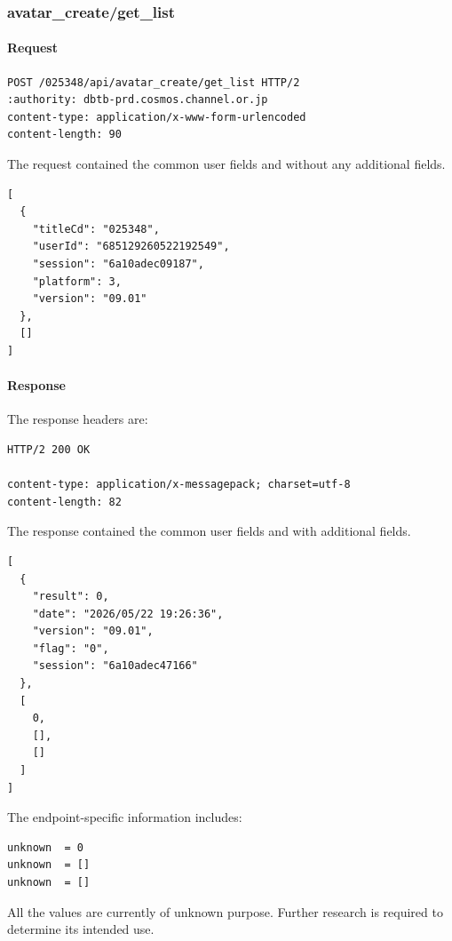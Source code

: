 \subsubsection{avatar\_create/get\_list}
\label{subsec:api_avatar_create_get_list}

\paragraph{Request}

\begin{lstlisting}
POST /025348/api/avatar_create/get_list HTTP/2
:authority: dbtb-prd.cosmos.channel.or.jp
content-type: application/x-www-form-urlencoded
content-length: 90
\end{lstlisting}

The request contained the common user fields and without any additional fields.

\begin{lstlisting}
[
  {
    "titleCd": "025348",
    "userId": "685129260522192549",
    "session": "6a10adec09187",
    "platform": 3,
    "version": "09.01"
  },
  []
]
\end{lstlisting}

\newpage

\paragraph{Response}

The response headers are:

\begin{lstlisting}
HTTP/2 200 OK

content-type: application/x-messagepack; charset=utf-8
content-length: 82
\end{lstlisting}

The response contained the common user fields and with additional fields.

\begin{lstlisting}
[
  {
    "result": 0,
    "date": "2026/05/22 19:26:36",
    "version": "09.01",
    "flag": "0",
    "session": "6a10adec47166"
  },
  [
    0,
    [],
    []
  ]
]
\end{lstlisting}

The endpoint-specific information includes:

\begin{lstlisting}
unknown  = 0
unknown  = []
unknown  = []
\end{lstlisting}

\begin{tcolorbox}[colback=yellow!10,colframe=orange!80!black,title=Warning]
All the values are currently of unknown purpose.
Further research is required to determine its intended use.
\end{tcolorbox}

\newpage